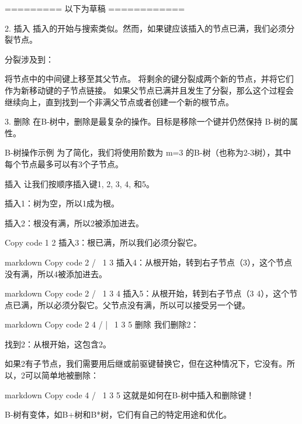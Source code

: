 ========= 以下为草稿 ============


2. 插入
插入的开始与搜索类似。然而，如果键应该插入的节点已满，我们必须分裂节点。

分裂涉及到：

将节点中的中间键上移至其父节点。
将剩余的键分裂成两个新的节点，并将它们作为新移动键的子节点链接。
如果父节点已满并且发生了分裂，那么这个过程会继续向上，直到找到一个非满父节点或者创建一个新的根节点。

3. 删除
在B-树中，删除是最复杂的操作。目标是移除一个键并仍然保持 B-树的属性。

B-树操作示例
为了简化，我们将使用阶数为 m=3 的B-树（也称为2-3树），其中每个节点最多可以有3个子节点。

插入
让我们按顺序插入键1, 2, 3, 4, 和5。

插入1：树为空，所以1成为根。

插入2：根没有满，所以2被添加进去。

Copy code
 1 2
插入3：根已满，所以我们必须分裂它。

markdown
Copy code
     2
   /   \
 1       3
插入4：从根开始，转到右子节点（3），这个节点没有满，所以4被添加进去。

markdown
Copy code
     2
   /   \
 1      3 4
插入5：从根开始，转到右子节点（3 4），这个节点已满，所以必须分裂它。父节点没有满，所以可以接受另一个键。

markdown
Copy code
     2 4
   /   |   \
 1      3    5
删除
我们删除2：

找到2：从根开始，这包含2。

如果2有子节点，我们需要用后继或前驱键替换它，但在这种情况下，它没有。所以，2可以简单地被删除：

markdown
Copy code
     4
   /   \
 1      3 5
这就是如何在B-树中插入和删除键！


B-树有变体，如B+树和B*树，它们有自己的特定用途和优化。
